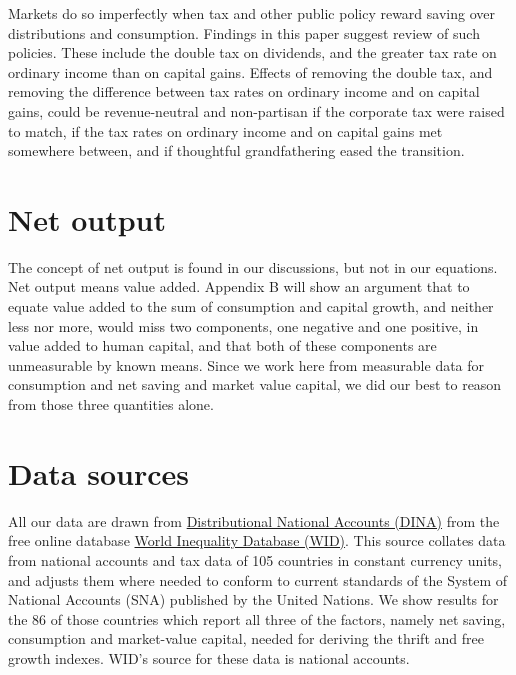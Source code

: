 %

%
Markets do so imperfectly when tax and other public policy reward
saving over distributions and consumption. Findings in this paper
suggest review of such policies. These include the double tax on
dividends, and the greater tax rate on ordinary income than on capital
gains. Effects of removing the double tax, and removing the difference
between tax rates on ordinary income and on capital gains, could be
revenue-neutral and non-partisan if the corporate tax were raised to
match, if the tax rates on ordinary income and on capital gains met
somewhere between, and if thoughtful grandfathering eased the
transition.
%
\hypertarget{net-output}{
\section{Net output}\label{net-output}
}
The concept of net output is found in our discussions, but not in our equations. Net output means value added. Appendix B will show an argument that to equate value added to the sum of consumption and capital growth, and neither less nor more, would miss two components, one negative and one positive, in value added to human capital, and that both of these components are unmeasurable by known means. Since we work here from measurable data for consumption and net saving and market value capital, we did our best to reason from those three quantities alone.
%
\FloatBarrier

\FloatBarrier



\hypertarget{data-sources}{%
\section{Data sources}\label{data-sources}}

All our data are drawn from \href{https://wid.world/document/distributional-national-accounts-guidelines-2020-concepts-and-methods-used-in-the-world-inequality-database/}{Distributional National Accounts (DINA)} from the free online database \href{wid.world.com}{World
Inequality Database (WID)}. This source collates data from national accounts and tax data
of 105 countries in constant currency units, and adjusts them where needed to conform to current standards of the System of National Accounts
(SNA) published by the United Nations. We show results for the 86 of
those countries which report all three of the factors, namely net
saving, consumption and market-value capital, needed for deriving
the thrift and free growth indexes. WID's source for these data is national accounts.

